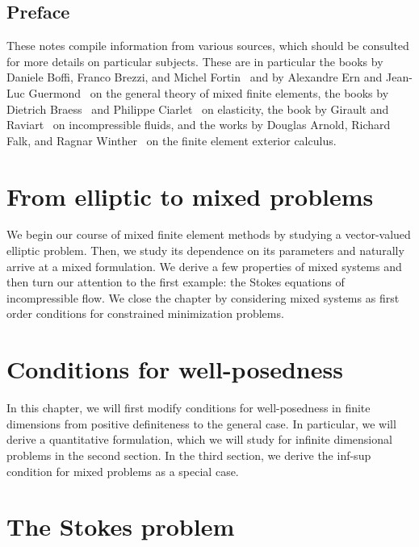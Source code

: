 \maketitle

\section*{Preface}
%

These notes compile information from various sources, which should be
consulted for more details on particular subjects. These are in
particular the books by Daniele Boffi, Franco Brezzi, and Michel
Fortin~\cite{BoffiBrezziFortin13} and by Alexandre Ern and Jean-Luc
Guermond~\cite{ErnGuermond04} on the general theory of mixed
finite elements, the books by Dietrich Braess~\cite{Braess97,Braess13}
and Philippe Ciarlet~\cite{Ciarlet88} on elasticity, the book by
Girault and Raviart~\cite{GiraultRaviart86} on incompressible fluids,
and the works by Douglas Arnold, Richard Falk, and Ragnar
Winther~\cite{ArnoldFalkWinther06acta,ArnoldFalkWinther10} on the
finite element exterior calculus.

\thispagestyle{empty}
\setcounter{page}{0}


\tableofcontents

\chapter{From elliptic to mixed problems}
We begin our course of mixed finite element methods by studying a
vector-valued elliptic problem. Then, we study its dependence on its
parameters and naturally arrive at a mixed formulation. We derive a
few properties of mixed systems and then turn our attention to the
first example: the Stokes equations of incompressible flow. We close
the chapter by considering mixed systems as first order conditions
for constrained minimization problems.




\chapter{Conditions for well-posedness}
In this chapter, we will first modify conditions for well-posedness in
finite dimensions from positive definiteness to the general case. In
particular, we will derive a quantitative formulation, which we will
study for infinite dimensional problems in the second section. In the
third section, we derive the inf-sup condition for mixed problems as a
special case.
\label{sec:wellposedness}


\chapter{The Stokes problem}


%

\printbibliography
\printindex


